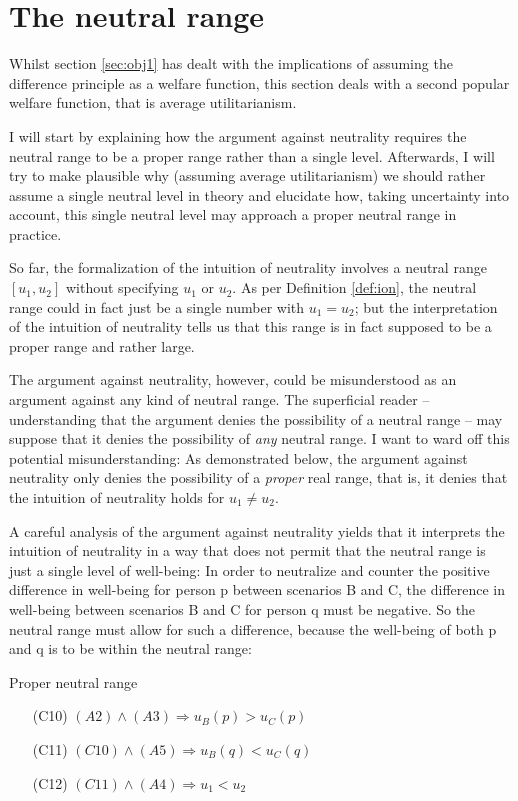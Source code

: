 \section{The neutral range}
\label{sec:obj2}

Whilst section \ref{sec:obj1} has dealt with the implications of assuming the difference principle as a welfare function, this section deals with a second popular welfare function, that is average utilitarianism. 

I will start by explaining how the argument against neutrality requires the neutral range to be a proper range rather than a single level. Afterwards, I will try to make plausible why (assuming average utilitarianism) we should rather assume a single neutral level in theory and elucidate how, taking uncertainty into account, this single neutral level may approach a proper neutral range in practice.  

So far, the formalization of the intuition of neutrality involves a neutral range $[u_1, u_2]$ without specifying $u_1$ or $u_2$. As per Definition \ref{def:ion}, the neutral range could in fact just be a single number with $u_1 = u_2$; but the interpretation of the intuition of neutrality tells us that this range is in fact supposed to be a proper range and rather large. 

The argument against neutrality, however, could be misunderstood as an argument against any kind of neutral range. The superficial reader -- understanding that the argument denies the possibility of a neutral range -- may suppose that it denies the possibility of \emph{any} neutral range. I want to ward off this potential misunderstanding: As demonstrated below, the argument against neutrality only denies the possibility of a \emph{proper} real range, that is, it denies that the intuition of neutrality holds for $u_1 \neq u_2$. 

A careful analysis of the argument against neutrality yields that it interprets the intuition of neutrality in a way that does not permit that the neutral range is just a single level of well-being: In order to neutralize and counter the positive difference in well-being for person p between scenarios B and C, the difference in well-being between scenarios B and C for person q must be negative. So the neutral range must allow for such a difference, because the well-being of both p and q is to be within the neutral range:

\begin{Corollary}{Proper neutral range}{}
\begin{enumerate}
\item[(C10)] \hspace{1cm} $(A2)  \wedge (A3) \Rightarrow u_B(p) > u_C(p)$
\item[(C11)] \hspace{1cm} $(C10) \wedge (A5) \Rightarrow u_B(q) < u_C(q)$
\item[(C12)] \hspace{1cm} $(C11) \wedge (A4) \Rightarrow u_1 < u_2$
\end{enumerate}
\end{Corollary}

